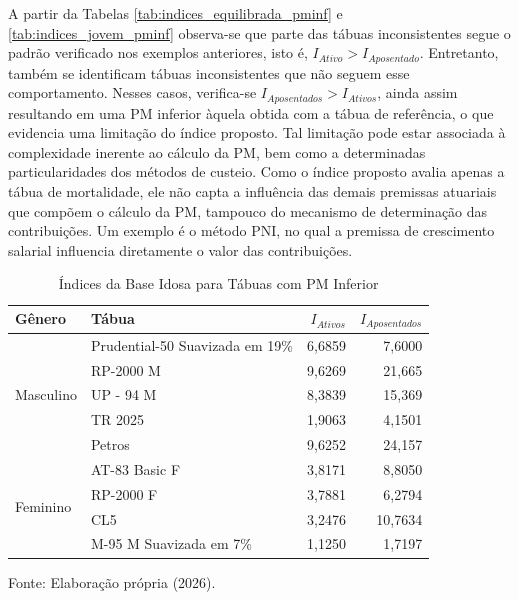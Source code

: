 \FloatBarrier
A partir da Tabelas \ref{tab:indices_equilibrada_pminf} e \ref{tab:indices_jovem_pminf} observa-se que parte das tábuas inconsistentes segue o padrão verificado nos exemplos anteriores, isto é, $I_{Ativo} > I_{Aposentado}$. Entretanto, também se identificam tábuas inconsistentes que não seguem esse comportamento. Nesses casos, verifica-se $I_{Aposentados} > I_{Ativos}$, ainda assim resultando em uma PM inferior àquela obtida com a tábua de referência, o que evidencia uma limitação do índice proposto. 
\newpage
Tal limitação pode estar associada à complexidade inerente ao cálculo da PM, bem como a determinadas particularidades dos métodos de custeio. Como o índice proposto avalia apenas a tábua de mortalidade, ele não capta a influência das demais premissas atuariais que compõem o cálculo da PM, tampouco do mecanismo de determinação das contribuições. Um exemplo é o método PNI, no qual a premissa de crescimento salarial influencia diretamente o valor das contribuições.
\vspace{0.25cm}
\begin{table}[htbp]
    \centering
    \caption{Índices da Base Idosa para Tábuas com PM Inferior}
    \begin{threeparttable}
    \renewcommand{\arraystretch}{1.0}
    \begin{tabular}{llrr}
    \toprule
    \textbf{Gênero} & \textbf{Tábua} & \textbf{$I_{Ativos}$} & \textbf{$I_{Aposentados}$} \\ 
    \midrule
    \multirow{5}{*}{Masculino} 
        & Prudential-50 Suavizada em 19\% & 6,6859 & 7,6000 \\
        & RP-2000 M               & 9,6269 & 21,665 \\
        & UP - 94 M	               & 8,3839 & 15,369 \\
        & TR 2025                  & 1,9063 & 4,1501 \\
        & Petros                   & 9,6252 & 24,157 \\ \hline
    \multirow{4}{*}{Feminino}
        & AT-83 Basic F  & 3,8171 & 8,8050 \\
        & RP-2000 F  & 3,7881 & 6,2794 \\
        & CL5	 & 3,2476 & 10,7634 \\
        & M-95 M Suavizada em 7\%  & 1,1250 & 1,7197 \\
    \bottomrule
    \end{tabular}
    \begin{tablenotes}[flushleft]
        \small
        \item Fonte: Elaboração própria (2026).
    \end{tablenotes}
    \end{threeparttable}
    \label{tab:indices_idosa_pminf}
\end{table}

